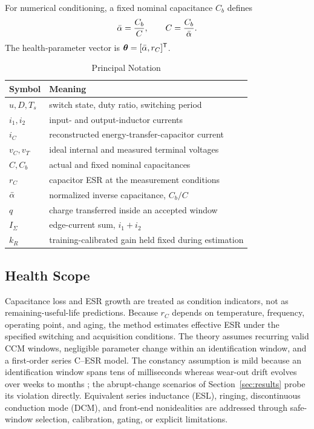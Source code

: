 For numerical conditioning, a fixed nominal capacitance $C_b$ defines
\begin{equation}
\bar{\alpha}=\frac{C_b}{C}, \qquad C=\frac{C_b}{\bar{\alpha}}.
\label{eq:alpha_definition}
\end{equation}
The health-parameter vector is $\bm{\theta}=[\bar{\alpha},r_C]^{\mathsf T}$.

\begin{table}[t]
\caption{Principal Notation}
\label{tab:notation}
\centering
\footnotesize
\begin{tabular}{ll}
\toprule
Symbol & Meaning \\
\midrule
$u,D,T_s$ & switch state, duty ratio, switching period \\
$i_1,i_2$ & input- and output-inductor currents \\
$i_C$ & reconstructed energy-transfer-capacitor current \\
$v_C,v_T$ & ideal internal and measured terminal voltages \\
$C,C_b$ & actual and fixed nominal capacitances \\
$r_C$ & capacitor ESR at the measurement conditions \\
$\bar{\alpha}$ & normalized inverse capacitance, $C_b/C$ \\
$q$ & charge transferred inside an accepted window \\
$I_\Sigma$ & edge-current sum, $i_1+i_2$ \\
$k_R$ & training-calibrated gain held fixed during estimation \\
\bottomrule
\end{tabular}
\end{table}

\subsection{Health Scope}

Capacitance loss and ESR growth are treated as condition indicators, not as remaining-useful-life predictions. Because $r_C$ depends on temperature, frequency, operating point, and aging, the method estimates effective ESR under the specified switching and acquisition conditions. The theory assumes recurring valid CCM windows, negligible parameter change within an identification window, and a first-order series C--ESR model. The constancy assumption is mild because an identification window spans tens of milliseconds whereas wear-out drift evolves over weeks to months \cite{wang2014reliability}; the abrupt-change scenarios of Section~\ref{sec:results} probe its violation directly. Equivalent series inductance (ESL), ringing, discontinuous conduction mode (DCM), and front-end nonidealities are addressed through safe-window selection, calibration, gating, or explicit limitations.

